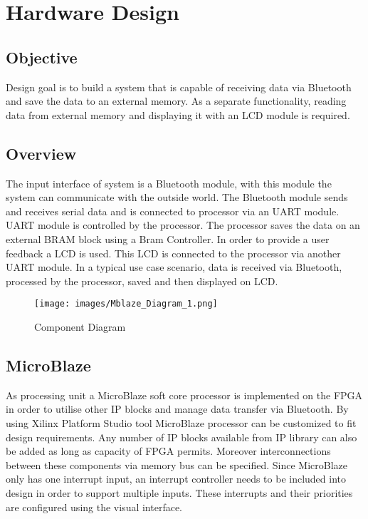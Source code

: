 
\chapter{Hardware Design}

\section{Objective}
Design goal is to build a system that is capable of receiving data via Bluetooth and save the data to an external memory. As a separate functionality, reading data from external memory and displaying it with an LCD module is required.


\section{Overview}

The input interface of system is a Bluetooth module, with this module the system can communicate with the outside world. The Bluetooth module sends and receives serial data and is connected to processor via an UART module. UART module is controlled by the processor. The processor saves the data on an external BRAM block using a Bram Controller. In order to provide a user feedback a LCD is used. This LCD is connected to the processor via another UART module. In a typical use case scenario, data is received via Bluetooth, processed by the processor, saved and then displayed on LCD. 


\begin{figure}
	\centering
	\texttt{[image: images/Mblaze\_Diagram\_1.png]}
	\caption{Component Diagram}
\end{figure}

\section{MicroBlaze}
As processing unit a MicroBlaze soft core processor is implemented on the FPGA in order to utilise other IP blocks and manage data transfer via Bluetooth. 
By using Xilinx Platform Studio tool MicroBlaze processor can be customized to fit design requirements. Any number of IP blocks available from IP library can also be added as long as capacity of FPGA permits. Moreover interconnections between these components via memory bus can be specified. Since MicroBlaze only has one interrupt input, an interrupt controller needs to be included into design in order to support multiple inputs. These interrupts and their priorities are configured using the visual interface.

